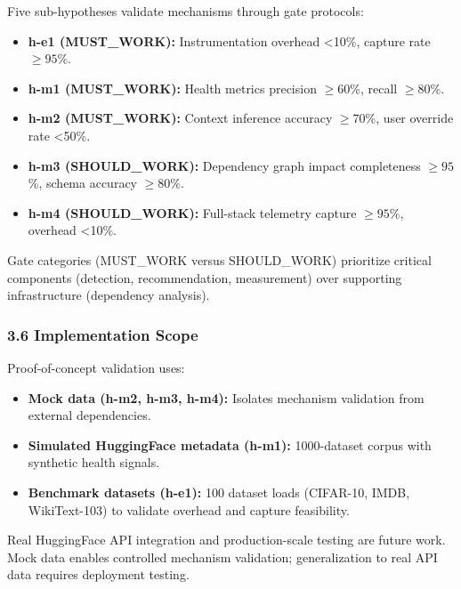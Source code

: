 Five sub-hypotheses validate mechanisms through gate protocols:

\begin{itemize}
\item \textbf{h-e1 (MUST\_WORK):} Instrumentation overhead <10\%, capture rate $\geq 95$\%.
\item \textbf{h-m1 (MUST\_WORK):} Health metrics precision $\geq 60$\%, recall $\geq 80$\%.
\item \textbf{h-m2 (MUST\_WORK):} Context inference accuracy $\geq 70$\%, user override rate <50\%.
\item \textbf{h-m3 (SHOULD\_WORK):} Dependency graph impact completeness $\geq 95$\%, schema accuracy $\geq 80$\%.
\item \textbf{h-m4 (SHOULD\_WORK):} Full-stack telemetry capture $\geq 95$\%, overhead <10\%.
\end{itemize}

Gate categories (MUST\_WORK versus SHOULD\_WORK) prioritize critical components (detection, recommendation, measurement) over supporting infrastructure (dependency analysis).

\subsubsection{3.6 Implementation Scope}

Proof-of-concept validation uses:
\begin{itemize}
\item \textbf{Mock data (h-m2, h-m3, h-m4):} Isolates mechanism validation from external dependencies.
\item \textbf{Simulated HuggingFace metadata (h-m1):} 1000-dataset corpus with synthetic health signals.
\item \textbf{Benchmark datasets (h-e1):} 100 dataset loads (CIFAR-10, IMDB, WikiText-103) to validate overhead and capture feasibility.
\end{itemize}

Real HuggingFace API integration and production-scale testing are future work. Mock data enables controlled mechanism validation; generalization to real API data requires deployment testing.
